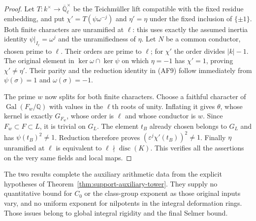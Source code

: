 \begin{proof}
Let $T:k^\times\to\overline{\mathbb Q}_\ell^\times$ be
the Teichm\"uller lift compatible with the fixed residue
embedding, and put
$\chi'=T(\psi\omega^{-j})$ and $\eta'=\eta$ under the
fixed inclusion of $\{\pm1\}$.
Both finite characters are unramified at $\ell$: this
uses exactly the assumed inertia identity
$\psi|_{I_\ell}=\omega^j$ and the unramifiedness of $\eta$.
Let $N$ be a common conductor, chosen prime to $\ell$.
Their orders are prime to $\ell$; for $\chi'$ the order
divides $|k|-1$.  The original element in
$\ker\omega\cap\ker\psi$ on which $\eta=-1$ has
$\chi'=1$, proving $\chi'\ne\eta'$.  Their parity and
the reduction identity in (AF9) follow immediately from
$\psi(\sigma)=1$ and $\omega(\sigma)=-1$.

The prime $w$ now splits for both finite characters.
Choose a faithful character of
$\operatorname{Gal}(F_w/\mathbb Q)$ with values in the
$\ell$th roots of unity.  Inflating it gives $\theta$,
whose kernel is exactly $G_{F_w}$, whose order is $\ell$
and whose conductor is $w$.  Since $F_w\subset F\subset L$,
it is trivial on $G_L$.  The element $t_B$ already chosen
belongs to $G_L$ and has $\psi(t_B)^2\ne1$.  Reduction
therefore proves $(\varepsilon^j\chi'(t_B))^2\ne1$.
Finally $\eta$ unramified at $\ell$ is equivalent to
$\ell\nmid\operatorname{disc}(K)$.  This verifies all
the assertions on the very same fields and local maps.
\end{proof}

The two results complete the auxiliary arithmetic data from the
explicit hypotheses of Theorem~\ref{thm:support-auxiliary-tower}.
They supply no quantitative bound for $C_0$ or the class-group
exponent as those original inputs vary, and no uniform exponent
for nilpotents in the integral deformation rings.  Those issues
belong to global integral rigidity and the final Selmer bound.
